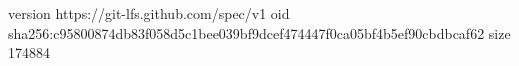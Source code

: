 version https://git-lfs.github.com/spec/v1
oid sha256:c95800874db83f058d5c1bee039bf9dcef474447f0ca05bf4b5ef90cbdbcaf62
size 174884
